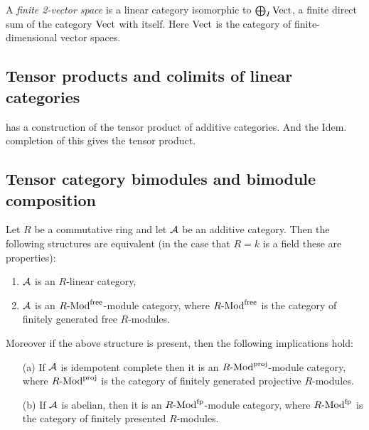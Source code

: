\documentclass{amsart}
\begin{document}


\begin{definition}
	A {\em finite 2-vector space} is a linear category isomorphic to $\bigoplus_I \mathrm{Vect}$,
	 a finite direct sum of the category $\mathrm{Vect}$ with itself.   Here $\mathrm{Vect}$ is the category of finite-dimensional vector spaces.
\end{definition}

\subsection{Tensor products and colimits of linear categories}

{\color{CSPcolor}
\cite{Tambara01} has a construction of the tensor product of additive categories. And the Idem. completion of this gives the tensor product. 

}
\subsection{Tensor category bimodules and bimodule composition}


\begin{proposition}
	Let $R$ be a commutative ring and let $\mathcal A$ be an additive category. Then the following structures are equivalent (in the case that $R= k$ is a field these are properties): 
	\begin{enumerate}
		\item $\mathcal A$ is an $R$-linear category,
		\item $\mathcal A$ is an $\Mod{R}{}^\textrm{free}$-module category, where $\Mod{R}{}^\textrm{free}$ is the category of finitely generated free $R$-modules.  
	\end{enumerate}
	Moreover if the above structure is present, then the following implications hold: 
	\begin{enumerate}
		\item [(a)] If $\mathcal A$ is idempotent complete then it is an $\Mod{R}{}^\textrm{proj}$-module category, where $\Mod{R}{}^\textrm{proj}$ is the category of finitely generated projective $R$-modules.  
		\item [(b)] If $\mathcal A$ is abelian, then it is an $\Mod{R}{}^\textrm{fp}$-module category, where $\Mod{R}{}^\textrm{fp}$ is the category of finitely presented $R$-modules.
		
	\end{enumerate}
\end{proposition}
\end{document}
